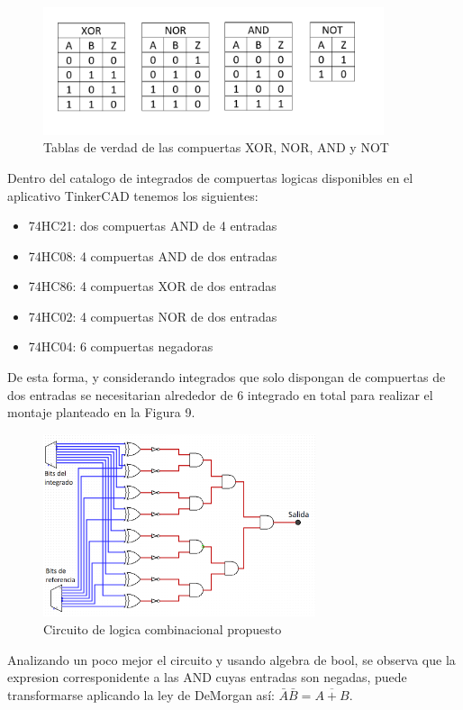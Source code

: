 \documentclass{article}
\begin{document}
\begin{figure}[!ht] 
\includegraphics[width=10cm]{compuertas.png}
\centering
\caption{Tablas de verdad de las compuertas XOR, NOR, AND y NOT}
\end{figure}

Dentro del catalogo de integrados de compuertas logicas disponibles en el aplicativo TinkerCAD tenemos los siguientes:
\begin{itemize}
    \item 74HC21: dos compuertas AND de 4 entradas
    \item 74HC08: 4 compuertas AND de dos entradas
    \item 74HC86: 4 compuertas XOR de dos entradas
    \item 74HC02: 4 compuertas NOR de dos entradas
    \item 74HC04: 6 compuertas negadoras\\
\end{itemize}

De esta forma, y considerando integrados que solo dispongan de compuertas de dos entradas se necesitarian alrededor de 6 integrado en total para realizar el montaje planteado en la Figura 9.

\begin{figure}[!h] 
\includegraphics[width=8cm]{logica1.png}
\centering
\caption{Circuito de logica combinacional propuesto}
\end{figure}

Analizando un poco mejor el circuito y usando algebra de bool, se observa que la expresion corresponidente a las AND cuyas entradas son negadas, puede transformarse aplicando la ley de DeMorgan así: $\bar{A}\bar{B} = \overline{A+B}$.
\end{document}
